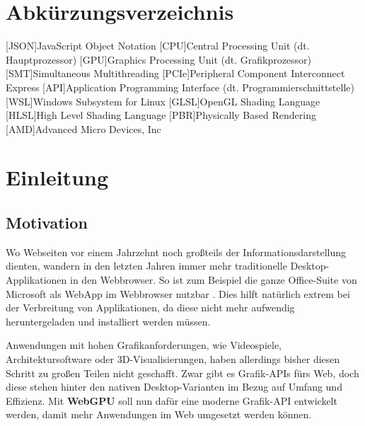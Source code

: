 \documentclass[oneside]{ausarbeitung}
\newcommand*{\quotize}[1]{\glqq #1\grqq}
\begin{document}
\chapter*{Abkürzungsverzeichnis}
\begin{acronym}[JSON]  %

[JSON]{JavaScript Object Notation}
[CPU]{Central Processing Unit (dt. Hauptprozessor)}
[GPU]{Graphics Processing Unit (dt. Grafikprozessor)}
[SMT]{Simultaneous Multithreading}
[PCIe]{Peripheral Component Interconnect Express}
[API]{Application Programming Interface (dt. Programmierschnittstelle)}
[WSL]{Windows Subsystem for Linux}
[GLSL]{OpenGL Shading Language}
[HLSL]{High Level Shading Language}
[PBR]{Physically Based Rendering}
[AMD]{Advanced Micro Devices, Inc}
\end{acronym}
\cleardoublepage
{}
\setcounter{page}{1}

\chapter{Einleitung}
\label{cha:einleitung}

\section{Motivation}
\label{sec:motivation}
Wo Webseiten vor einem Jahrzehnt noch großteils der Informationsdarstellung dienten, wandern in den letzten Jahren immer mehr traditionelle Desktop-Applikationen in den Webbrowser. So ist zum Beispiel die ganze Office-Suite von Microsoft als WebApp im Webbrowser nutzbar \cite{microsoft:webapps}. Dies hilft natürlich extrem bei der Verbreitung von Applikationen, da diese nicht mehr aufwendig heruntergeladen und installiert werden müssen.

Anwendungen mit hohen Grafikanforderungen, wie Videospiele, Architektursoftware oder 3D-Visualisierungen, haben allerdings bisher diesen Schritt zu großen Teilen nicht geschafft. Zwar gibt es Grafik-APIs fürs Web, doch diese stehen hinter den nativen Desktop-Varianten im Bezug auf Umfang und Effizienz. Mit \textbf{WebGPU} soll nun dafür eine \quotize{moderne} Grafik-API entwickelt werden, damit mehr Anwendungen im Web umgesetzt werden können.
\end{document}
